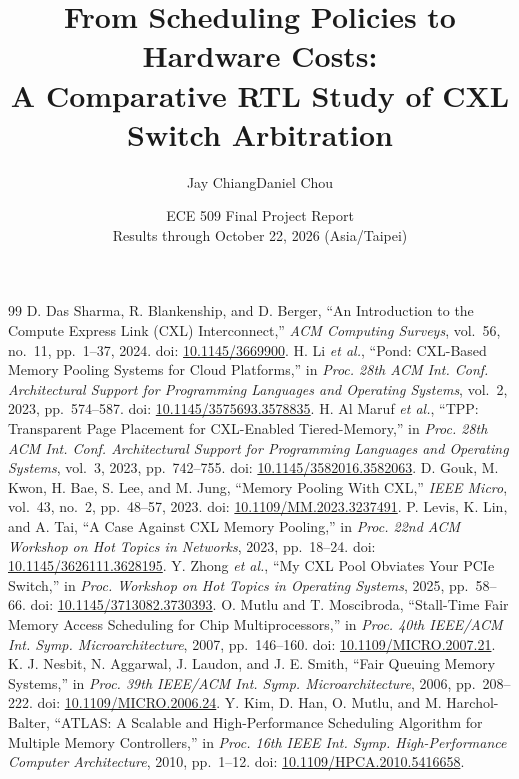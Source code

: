 \documentclass[10pt,letterpaper,twocolumn]{article}
\title{\vspace{-2em}\bfseries From Scheduling Policies to Hardware Costs:\\ A Comparative RTL Study of CXL Switch Arbitration}
\author{Jay Chiang\qquad Daniel Chou}
\date{\normalsize ECE 509 Final Project Report\\\small Results through October 22, 2026 (Asia/Taipei)}
\begin{document}
\maketitle

\clearpage

\begingroup\footnotesize
\begin{thebibliography}{99}
 D. Das Sharma, R. Blankenship, and D. Berger, ``An Introduction to the Compute Express Link (CXL) Interconnect,'' \emph{ACM Computing Surveys}, vol.~56, no.~11, pp.~1--37, 2024. doi: \href{https://doi.org/10.1145/3669900}{10.1145/3669900}.
 H. Li \emph{et al.}, ``Pond: CXL-Based Memory Pooling Systems for Cloud Platforms,'' in \emph{Proc. 28th ACM Int. Conf. Architectural Support for Programming Languages and Operating Systems}, vol.~2, 2023, pp.~574--587. doi: \href{https://doi.org/10.1145/3575693.3578835}{10.1145/3575693.3578835}.
 H. Al Maruf \emph{et al.}, ``TPP: Transparent Page Placement for CXL-Enabled Tiered-Memory,'' in \emph{Proc. 28th ACM Int. Conf. Architectural Support for Programming Languages and Operating Systems}, vol.~3, 2023, pp.~742--755. doi: \href{https://doi.org/10.1145/3582016.3582063}{10.1145/3582016.3582063}.
 D. Gouk, M. Kwon, H. Bae, S. Lee, and M. Jung, ``Memory Pooling With CXL,'' \emph{IEEE Micro}, vol.~43, no.~2, pp.~48--57, 2023. doi: \href{https://doi.org/10.1109/MM.2023.3237491}{10.1109/MM.2023.3237491}.
 P. Levis, K. Lin, and A. Tai, ``A Case Against CXL Memory Pooling,'' in \emph{Proc. 22nd ACM Workshop on Hot Topics in Networks}, 2023, pp.~18--24. doi: \href{https://doi.org/10.1145/3626111.3628195}{10.1145/3626111.3628195}.
 Y. Zhong \emph{et al.}, ``My CXL Pool Obviates Your PCIe Switch,'' in \emph{Proc. Workshop on Hot Topics in Operating Systems}, 2025, pp.~58--66. doi: \href{https://doi.org/10.1145/3713082.3730393}{10.1145/3713082.3730393}.
 O. Mutlu and T. Moscibroda, ``Stall-Time Fair Memory Access Scheduling for Chip Multiprocessors,'' in \emph{Proc. 40th IEEE/ACM Int. Symp. Microarchitecture}, 2007, pp.~146--160. doi: \href{https://doi.org/10.1109/MICRO.2007.21}{10.1109/MICRO.2007.21}.
 K. J. Nesbit, N. Aggarwal, J. Laudon, and J. E. Smith, ``Fair Queuing Memory Systems,'' in \emph{Proc. 39th IEEE/ACM Int. Symp. Microarchitecture}, 2006, pp.~208--222. doi: \href{https://doi.org/10.1109/MICRO.2006.24}{10.1109/MICRO.2006.24}.
 Y. Kim, D. Han, O. Mutlu, and M. Harchol-Balter, ``ATLAS: A Scalable and High-Performance Scheduling Algorithm for Multiple Memory Controllers,'' in \emph{Proc. 16th IEEE Int. Symp. High-Performance Computer Architecture}, 2010, pp.~1--12. doi: \href{https://doi.org/10.1109/HPCA.2010.5416658}{10.1109/HPCA.2010.5416658}.

\end{thebibliography}
\end{document}
